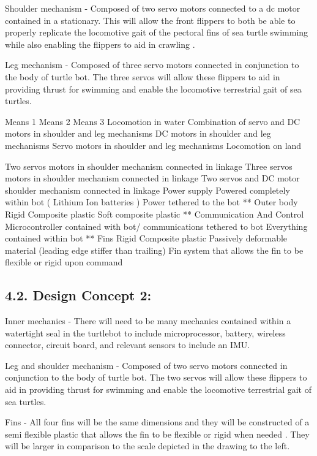 \documentclass[10pt]{article}
\begin{document}
Shoulder mechanism - Composed of two servo motors connected to a dc motor contained in a stationary. This will allow the front flippers to both be able to properly replicate the locomotive  gait of the pectoral fins of sea turtle swimming while also enabling the flippers to aid in crawling .

Leg mechanism - Composed of three servo motors connected in conjunction to the body of turtle bot. The three servos will allow these flippers to aid in providing thrust for swimming and enable the locomotive terrestrial gait of sea turtles.   

Means 1
Means 2
Means 3
Locomotion in water 
Combination of servo and DC motors in shoulder and leg mechanisms 
DC motors in shoulder and leg mechanisms
Servo motors in shoulder and leg mechanisms
Locomotion on land 

Two servos motors in shoulder mechanism connected in linkage 
Three servos motors in shoulder mechanism connected in linkage 
Two servos and DC motor shoulder mechanism connected in linkage 
Power supply 
Powered completely within bot ( Lithium Ion batteries )
Power tethered to the bot 
**
Outer body 
Rigid Composite plastic 
Soft composite plastic
**
Communication
 And Control
Microcontroller contained with bot/ communications tethered to bot
Everything contained within bot 
**
Fins 
Rigid Composite plastic
Passively deformable material (leading edge stiffer than trailing) 
Fin system that allows the fin to be flexible or rigid upon command 

\subsection{4.2. Design Concept 2:}

Inner mechanics - There will need to be many mechanics contained within a watertight seal in the turtlebot to include microprocessor, battery, wireless connector, circuit board, and relevant sensors to include an IMU.

Leg and shoulder mechanism - Composed of two servo motors connected in conjunction to the body of turtle bot. The two servos will allow these flippers to aid in providing thrust for swimming and enable the locomotive terrestrial gait of sea turtles.  

Fins - All four fins will be the same dimensions and they will be constructed of a semi flexible plastic that allows the fin to be flexible or rigid when needed . They will be larger in comparison to the scale depicted in the drawing to the left. 
\end{document}
